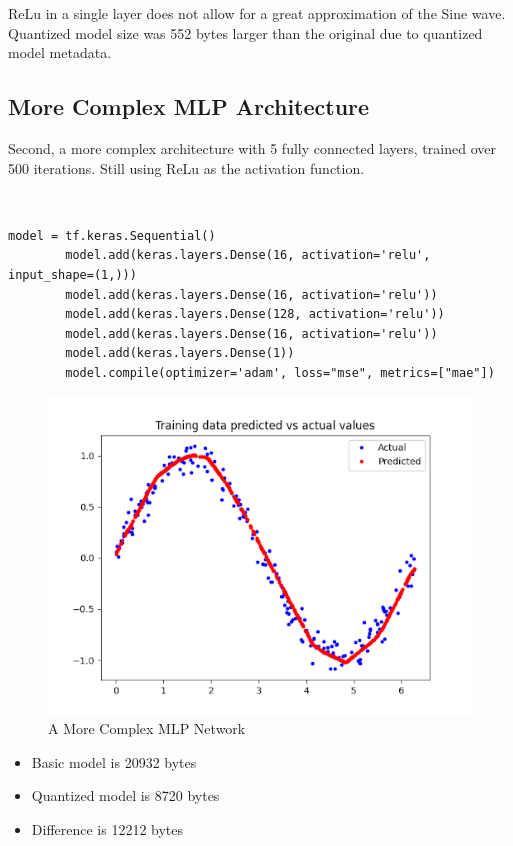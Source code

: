 \documentclass{article}
\begin{document}
    ReLu in a single layer does not allow for a great approximation of the Sine wave.
    Quantized model size was 552 bytes larger than the original due to quantized model metadata.

    \subsection{More Complex MLP Architecture}
    Second, a more complex architecture with 5 fully connected layers, trained over 500 iterations.
    Still using ReLu as the activation function.

    \\
    \begin{lstlisting}[label={lst:mlp2}]
        model = tf.keras.Sequential()
        model.add(keras.layers.Dense(16, activation='relu', input_shape=(1,)))
        model.add(keras.layers.Dense(16, activation='relu'))
        model.add(keras.layers.Dense(128, activation='relu'))
        model.add(keras.layers.Dense(16, activation='relu'))
        model.add(keras.layers.Dense(1))
        model.compile(optimizer='adam', loss="mse", metrics=["mae"])
    \end{lstlisting}

    \begin{figure}[!htbp]
        \centerline{\includegraphics[width=0.8\columnwidth]{complex}}
        \caption{A More Complex MLP Network}
        \label{fig:complex}
    \end{figure}

    \begin{itemize}
        \item Basic model is 20932 bytes
        \item Quantized model is 8720 bytes
        \item Difference is 12212 bytes
    \end{itemize}
\end{document}
